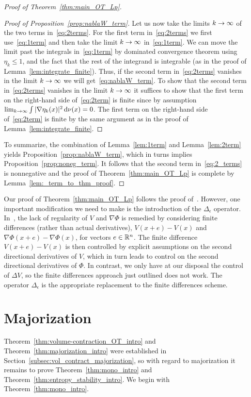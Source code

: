 \documentclass[AHL,Unicode,longabstracts]{cedram}
\newcommand{\R}{\mathbb R}
\newcommand{\V}{V}
\newcommand{\dd}{n}
\newcommand{\target}{\nu}
\newcommand*\diff{\mathop{}\!\mathrm{d}}
\newcommand{\OT}{\Phi}
\renewcommand*{\to}{\mathchoice{\longrightarrow}{\rightarrow}{\rightarrow}{\rightarrow}}
\let\oldin\in
\renewcommand{\in}{\mathchoice{\oldin}{\oldin}{\,\oldin\,}{\,\oldin\,}}
\begin{document}
\begin{proof}[Proof of Theorem~\ref{thm:main_OT_Lp}]
\begin{proof}[Proof of Proposition~\ref{prop:nablaW_term}]
Let us now take the limits $k\to\infty$ of the two terms in~\eqref{eq:2terms}. For the first term in~\eqref{eq:2terms} we first use~\eqref{eq:1term} and then take the limit $k\to\infty$ in~\eqref{eq:1term}. We can move the limit past the integrals in~\eqref{eq:1term} by dominated convergence theorem using $\eta_k\le 1$, and the fact that the rest of the integrand is integrable (as in the proof of Lemma~\ref{lem:integrate_finite}). Thus, if the second term in~\eqref{eq:2terms} vanishes in the limit $k\to\infty$ we will get~\eqref{eq:nablaW_term}. To show that the second term in~\eqref{eq:2terms} vanishes in the limit $k\to\infty$ it suffices to show that the first term on the right-hand side of~\eqref{eq:2term} is finite since by assumption $\lim_{k\to\infty}\int |\nabla\eta_k(x)|^2 \diff\target(x)=0$. The first term on the right-hand side of~\eqref{eq:2term} is finite by the same argument as in the proof of Lemma~\ref{lem:integrate_finite}.
\end{proof}

To summarize, the combination of Lemma~\ref{lem:1term} and Lemma~\ref{lem:2term} yields Proposition~\ref{prop:nablaW_term}, which in turns implies Proposition~\ref{prop:noneg_term}. It follows that the second term in~\eqref{eq:2_terms} is nonnegative and the proof of Theorem~\ref{thm:main_OT_Lp} is complete by Lemma~\ref{lem:_term_to_thm_proof}.
\end{proof}

\begin{rema}\label{rem:modification}
Our proof of Theorem~\ref{thm:main_OT_Lp} follows the proof of~\cite[Theorem~6.2]{kolesnikov2011mass}. However, one important modification we need to make is the introduction of the $\Delta_{\epsilon}$ operator. In~\cite{kolesnikov2011mass}, the lack of regularity of $\V$ and $\nabla\OT$ is remedied by considering finite differences (rather than actual derivatives), $\V(x+e)-\V(x)$ and $\nabla\OT(x+e)-\nabla\OT(x)$, for vectors $e\in\R^{\dd}$. The finite difference $\V(x+e)-\V(x)$ is then controlled by explicit assumptions on the second directional derivatives of $\V$, which in turn leads to control on the second directional derivatives of $\OT$. In contrast, we only have at our disposal the control of $\Delta \V$, so the finite differences approach just outlined does not work. The operator $\Delta_{\epsilon}$ is the appropriate replacement to the finite differences scheme.
\end{rema}


\section{Majorization}\label{sec:major}
Theorem~\ref{thm:volume-contraction_OT_intro} and Theorem~\ref{thm:majorization_intro} were established in Section~\ref{subsec:vol_contract_majorization}, so with regard to majorization it remains to prove Theorem~\ref{thm:mono_intro} and Theorem~\ref{thm:entropy_stability_intro}. We begin with Theorem~\ref{thm:mono_intro}.
\end{document}
